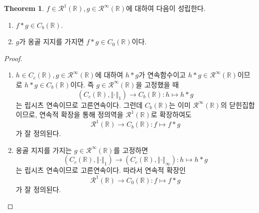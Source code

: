 \documentclass[11pt]{book}
\numberwithin{equation}{chapter}
\def\RR{\mathbb{R}}
\def\calR{\mathcal{R}}
\newcommand{\norm}[1]{\left\Vert#1\right\Vert}
\theoremstyle{definition}
\newtheorem{thm}{Theorem}[section]
\newenvironment{enum}
	{\begin{enumerate}[label=(\alph*), leftmargin=2\parindent]}
	{\end{enumerate}}
\begin{document}
\begin{thm} \label{14.3.7}
    \(f \in \calR^1(\RR), g \in \calR^\infty(\RR)\)에 대하여 다음이 성립한다.
    \begin{enum}
        \item \(f * g \in C_b(\RR)\).
        \item \(g\)가 옹골 지지를 가지면 \(f * g \in C_0(\RR)\)이다.
    \end{enum}
\end{thm}
\begin{proof}
    \quad

    \begin{enum}
        \item \(h \in C_c(\RR), g \in \calR^\infty(\RR)\)에 대하여 \(h * g\)가 연속함수이고 \(h * g \in \calR^\infty(\RR)\)이므로 \(h * g \in C_b(\RR)\)이다. 즉 \(g \in \calR^\infty(\RR)\)을 고정했을 때
        \[
        (C_c(\RR), \norm{\cdot}_1) \to C_b(\RR) : h \mapsto h * g
        \]
        는 립시츠 연속이므로 고른연속이다. 그런데 \(C_b(\RR)\)는 이미 \(\calR^\infty(\RR)\)의 닫힌집합이므로, 연속적 확장을 통해 정의역을 \(\calR^1(\RR)\)로 확장하여도
        \[
        \calR^1(\RR) \to C_b(\RR) : f \mapsto f * g    
        \]
        가 잘 정의된다.
        \item 옹골 지지를 가지는 \(g \in \calR^\infty(\RR)\)를 고정하면
        \[
        (C_c(\RR), \norm{\cdot}_1) \to (C_c(\RR), \norm{\cdot}_\infty) : h \mapsto h * g
        \]
        는 립시츠 연속이므로 고른연속이다. 따라서 연속적 확장인
        \[
            \calR^1(\RR) \to C_0(\RR) : f \mapsto f * g
        \]
        가 잘 정의된다.
    \end{enum}
\end{proof}
\end{document}
